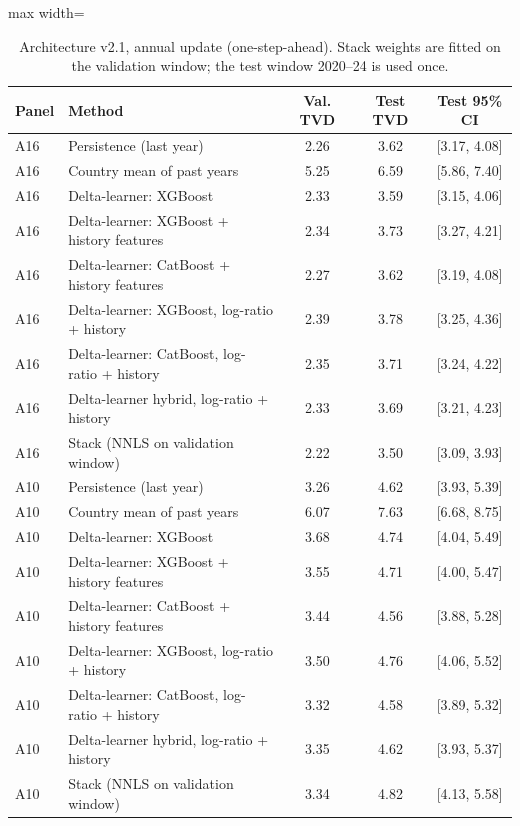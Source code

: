 \begin{table}[H]
\caption{Architecture v2.1, annual update (one-step-ahead). Stack weights are fitted on the validation window; the test window 2020--24 is used once.}\label{tab:Ehist}
\centering\footnotesize
\renewcommand{\arraystretch}{1.0}
\begin{adjustbox}{max width=\linewidth}
\begin{tabular}{llccc}
\toprule
Panel & Method & Val. TVD & Test TVD & Test 95\% CI \\
\midrule
A16 & Persistence (last year) & 2.26 & 3.62 & [3.17, 4.08] \\
A16 & Country mean of past years & 5.25 & 6.59 & [5.86, 7.40] \\
A16 & Delta-learner: XGBoost & 2.33 & 3.59 & [3.15, 4.06] \\
A16 & Delta-learner: XGBoost + history features & 2.34 & 3.73 & [3.27, 4.21] \\
A16 & Delta-learner: CatBoost + history features & 2.27 & 3.62 & [3.19, 4.08] \\
A16 & Delta-learner: XGBoost, log-ratio + history & 2.39 & 3.78 & [3.25, 4.36] \\
A16 & Delta-learner: CatBoost, log-ratio + history & 2.35 & 3.71 & [3.24, 4.22] \\
A16 & Delta-learner hybrid, log-ratio + history & 2.33 & 3.69 & [3.21, 4.23] \\
A16 & Stack (NNLS on validation window) & 2.22 & 3.50 & [3.09, 3.93] \\
\midrule
A10 & Persistence (last year) & 3.26 & 4.62 & [3.93, 5.39] \\
A10 & Country mean of past years & 6.07 & 7.63 & [6.68, 8.75] \\
A10 & Delta-learner: XGBoost & 3.68 & 4.74 & [4.04, 5.49] \\
A10 & Delta-learner: XGBoost + history features & 3.55 & 4.71 & [4.00, 5.47] \\
A10 & Delta-learner: CatBoost + history features & 3.44 & 4.56 & [3.88, 5.28] \\
A10 & Delta-learner: XGBoost, log-ratio + history & 3.50 & 4.76 & [4.06, 5.52] \\
A10 & Delta-learner: CatBoost, log-ratio + history & 3.32 & 4.58 & [3.89, 5.32] \\
A10 & Delta-learner hybrid, log-ratio + history & 3.35 & 4.62 & [3.93, 5.37] \\
A10 & Stack (NNLS on validation window) & 3.34 & 4.82 & [4.13, 5.58] \\
\bottomrule
\end{tabular}\end{adjustbox}
\end{table}
